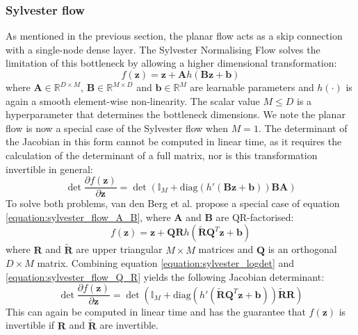 \documentclass{report}
\newcommand{\bA}{\mathbf{A}}
\newcommand{\bB}{\mathbf{B}}
\newcommand{\bb}{\mathbf{b}}
\newcommand{\eye}{\mathbb{I}}
\newcommand{\bQ}{\mathbf{Q}}
\newcommand{\R}{\mathbb{R}}
\newcommand{\bR}{\mathbf{R}}
\newcommand{\bz}{\mathbf{z}}
\newcommand{\parfrac}[2]{\frac{\partial #1}{\partial#2}}
\begin{document}
\subsubsection{Sylvester flow}
As mentioned in the previous section, the planar flow acts as a skip connection with a single-node dense layer. The Sylvester Normalising Flow\cite{berg2018sylvester} solves the limitation of this bottleneck by allowing a higher dimensional transformation:
\begin{equation}\label{equation:sylvester_flow_A_B}
    f(\bz) = \bz + \bA h(\bB\bz + \bb)
\end{equation}
where $\bA \in \R^{D\times M}$, $\bB \in \R^{M\times D}$ and $\bb \in \R^M$ are learnable parameters and $h(\cdot)$ is again a smooth element-wise non-linearity. The scalar value $M \leq D$ is a hyperparameter that determines the bottleneck dimensions. We note the planar flow is now a special case of the Sylvester flow when $M=1$. The determinant of the Jacobian in this form cannot be computed in linear time, as it requires the calculation of the determinant of a full matrix, nor is this transformation invertible in general:
\begin{equation}\label{equation:sylvester_logdet}
    \det \parfrac{f(\bz)}{\bz} = \det (\eye_M + \text{diag}(h'(\bB\bz + \bb))\bB\bA)
\end{equation}
To solve both problems, van den Berg et al. propose a special case of equation \ref{equation:sylvester_flow_A_B}, where $\bA$ and $\bB$ are QR-factorised:
\begin{equation}\label{equation:sylvester_flow_Q_R}
    f(\bz) = \bz + \bQ\bR h(\widetilde{\bR}\bQ^T\bz + \bb)
\end{equation}
where $\bR$ and $\widetilde{\bR}$ are upper triangular $M \times M$ matrices and $\bQ$ is an orthogonal $D \times M$ matrix. Combining equation \ref{equation:sylvester_logdet} and \ref{equation:sylvester_flow_Q_R} yields the following Jacobian determinant:
\begin{equation}
        \det \parfrac{f(\bz)}{\bz} = \det (\eye_M + \text{diag}(h'(\widetilde{\bR}\bQ^T\bz + \bb))\widetilde{\bR}\bR)
\end{equation}
This can again be computed in linear time and has the guarantee that $f(\bz)$ is invertible if $\bR$ and $\widetilde{\bR}$ are invertible. 
\end{document}
